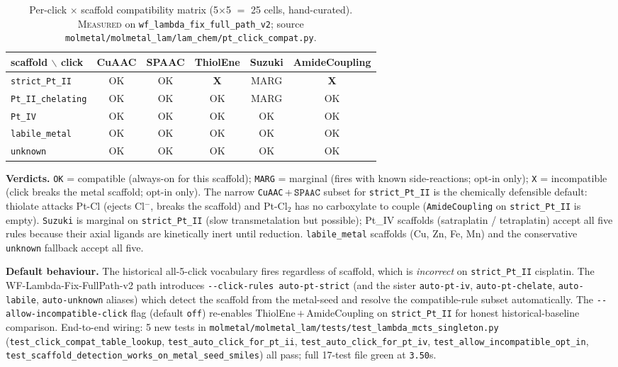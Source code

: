 \begin{table}[h]
  \centering
  \small
  \caption{Per-click $\times$ scaffold compatibility matrix
  (5$\times$5 $=$ 25 cells, hand-curated). \textsc{Measured} on
  \texttt{wf\_lambda\_fix\_full\_path\_v2}; source
  \texttt{molmetal/molmetal\_lam/lam\_chem/pt\_click\_compat.py}.}
  \label{tab:scaffold-aware-gate}
  \begin{tabular}{lccccc}
    \hline
    \textbf{scaffold} $\backslash$ \textbf{click} & CuAAC & SPAAC & ThiolEne & Suzuki & AmideCoupling \\
    \hline
    \texttt{strict\_Pt\_II}    & OK & OK & \textbf{X} & MARG & \textbf{X} \\
    \texttt{Pt\_II\_chelating} & OK & OK & OK         & MARG & OK        \\
    \texttt{Pt\_IV}            & OK & OK & OK         & OK   & OK        \\
    \texttt{labile\_metal}     & OK & OK & OK         & OK   & OK        \\
    \texttt{unknown}           & OK & OK & OK         & OK   & OK        \\
    \hline
  \end{tabular}
\end{table}

\noindent\textbf{Verdicts.} \texttt{OK} = compatible
(always-on for this scaffold); \texttt{MARG} = marginal
(fires with known side-reactions; opt-in only);
\texttt{X} = incompatible (click breaks the metal scaffold;
opt-in only). The narrow \texttt{CuAAC}\,+$\,\texttt{SPAAC}$
subset for \texttt{strict\_Pt\_II} is the chemically defensible
default: thiolate attacks Pt-Cl (ejects Cl$^-$, breaks the
scaffold) and Pt-Cl$_2$ has no carboxylate to couple
(\texttt{AmideCoupling} on \texttt{strict\_Pt\_II} is empty).
\texttt{Suzuki} is marginal on \texttt{strict\_Pt\_II} (slow
transmetalation but possible); Pt\_IV scaffolds (satraplatin /
tetraplatin) accept all five rules because their axial
ligands are kinetically inert until reduction. \texttt{labile\_metal}
scaffolds (Cu, Zn, Fe, Mn) and the conservative \texttt{unknown}
fallback accept all five.

\noindent\textbf{Default behaviour.} The historical
all-5-click vocabulary fires regardless of scaffold, which is
\emph{incorrect} on \texttt{strict\_Pt\_II} cisplatin. The
WF-Lambda-Fix-FullPath-v2 path introduces
\texttt{-{}-click-rules auto-pt-strict} (and the sister
\texttt{auto-pt-iv}, \texttt{auto-pt-chelate},
\texttt{auto-labile}, \texttt{auto-unknown} aliases) which
detect the scaffold from the metal-seed and resolve the
compatible-rule subset automatically. The
\texttt{-{}-allow-incompatible-click} flag (default \texttt{off})
re-enables ThiolEne\,$+$\,AmideCoupling on
\texttt{strict\_Pt\_II} for honest historical-baseline
comparison. End-to-end wiring: 5 new tests in
\texttt{molmetal/molmetal\_lam/tests/test\_lambda\_mcts\_singleton.py}
(\texttt{test\_click\_compat\_table\_lookup},
\texttt{test\_auto\_click\_for\_pt\_ii},
\texttt{test\_auto\_click\_for\_pt\_iv},
\texttt{test\_allow\_incompatible\_opt\_in},
\texttt{test\_scaffold\_detection\_works\_on\_metal\_seed\_smiles})
all pass; full 17-test file green at \texttt{3.50}s.

